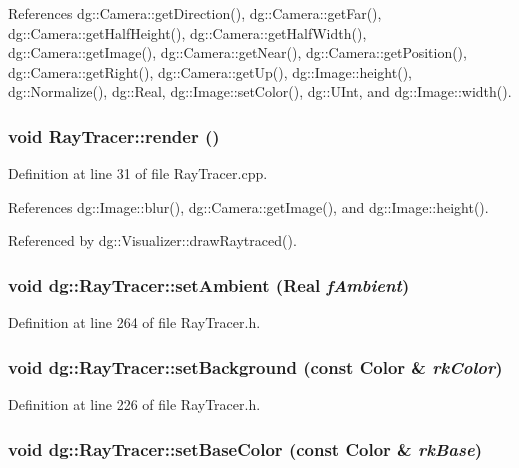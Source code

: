 References dg::Camera::get\-Direction(), dg::Camera::get\-Far(), dg::Camera::get\-Half\-Height(), dg::Camera::get\-Half\-Width(), dg::Camera::get\-Image(), dg::Camera::get\-Near(), dg::Camera::get\-Position(), dg::Camera::get\-Right(), dg::Camera::get\-Up(), dg::Image::height(), dg::Normalize(), dg::Real, dg::Image::set\-Color(), dg::UInt, and dg::Image::width().
\subsubsection{\setlength{\rightskip}{0pt plus 5cm}void Ray\-Tracer::render ()}\label{classdg_1_1RayTracer_a32}




Definition at line 31 of file Ray\-Tracer.cpp.

References dg::Image::blur(), dg::Camera::get\-Image(), and dg::Image::height().

Referenced by dg::Visualizer::draw\-Raytraced().
\subsubsection{\setlength{\rightskip}{0pt plus 5cm}void dg::Ray\-Tracer::set\-Ambient ({\bf Real} {\em f\-Ambient})\hspace{0.3cm}{\tt  [inline]}}\label{classdg_1_1RayTracer_a23}




Definition at line 264 of file Ray\-Tracer.h.
\subsubsection{\setlength{\rightskip}{0pt plus 5cm}void dg::Ray\-Tracer::set\-Background (const {\bf Color} \& {\em rk\-Color})\hspace{0.3cm}{\tt  [inline]}}\label{classdg_1_1RayTracer_a20}




Definition at line 226 of file Ray\-Tracer.h.
\subsubsection{\setlength{\rightskip}{0pt plus 5cm}void dg::Ray\-Tracer::set\-Base\-Color (const {\bf Color} \& {\em rk\-Base})\hspace{0.3cm}{\tt  [inline]}}\label{classdg_1_1RayTracer_a31}




